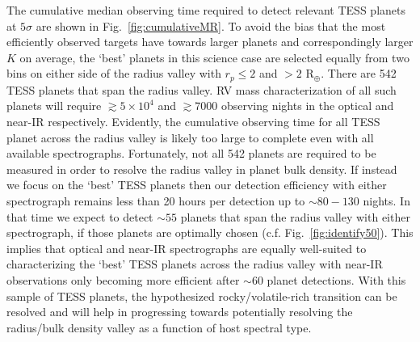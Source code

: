 The cumulative median observing time required to detect relevant TESS planets at $5\sigma$ are
shown in Fig.~\ref{fig:cumulativeMR}. To avoid the bias that the most efficiently observed targets
have towards larger planets and correspondingly larger $K$ on average, the `best' planets in this science
case are selected equally from two bins on either side of the radius valley with $r_p \leq 2$ and
$>2$ R$_{\oplus}$. There are 542 TESS planets that span the radius valley.
RV mass characterization of all such planets will require $\gtrsim 5 \times 10^4$ and $\gtrsim 7000$
observing nights in the optical and near-IR respectively.
Evidently, the cumulative observing time for all TESS planet across the radius valley is
likely too large to complete even with all available spectrographs. Fortunately, not all
542 planets are required to be measured in order to resolve the radius valley in
planet bulk density. If instead we focus on the `best' TESS planets then our detection
efficiency with either spectrograph remains less than 20 hours per detection up to
$\sim 80-130$ nights.
In that time we expect to detect $\sim 55$ planets that span the radius valley with either
spectrograph, if those planets are optimally chosen (c.f. Fig.~\ref{fig:identify50}).
This implies that optical and near-IR spectrographs are equally well-suited to characterizing
the `best' TESS planets across the radius valley with near-IR observations
only becoming more efficient after $\sim 60$ planet detections.
With this sample of TESS planets, the hypothesized rocky/volatile-rich transition can be resolved
and will help in progressing towards potentially resolving the radius/bulk density valley as
a function of host spectral type.

